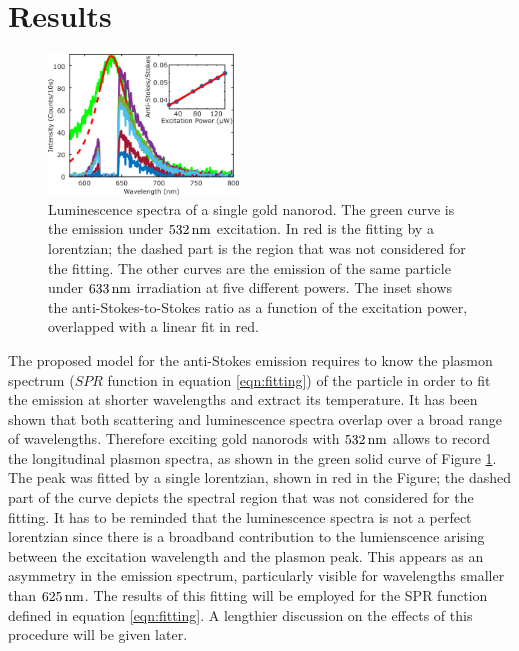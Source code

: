 \section{Results}
\begin{figure}[htp] \centering
\includegraphics[width=0.45\textwidth]{Chapters/04_Anti-Stokes/Figures/02_Several_Intensities/02_several_intensities.png}
\caption{Luminescence spectra of a single gold nanorod. The green curve is the
emission under $532\,\textrm{nm}$ excitation. In red is the fitting by a lorentzian; the
dashed part is the region that was not considered for the fitting. The other
curves are the emission of the same particle under $633\,\textrm{nm}$ irradiation at five 
different powers. The inset shows the anti-Stokes-to-Stokes ratio as a function
of the excitation power, overlapped with a linear fit in red.}
	\label{fig:spectra_rod}
\end{figure}

The proposed model for the anti-Stokes emission requires to know the plasmon
spectrum ($SPR$ function in equation \ref{eqn:fitting}) of the particle in order
to fit the emission at shorter wavelengths and extract its temperature. It has
been shown that both scattering and luminescence spectra overlap over a broad
range of wavelengths\cite{Yorulmaz2012}. Therefore exciting gold nanorods with
$532\,\textrm{nm}$ allows to record the longitudinal plasmon spectra, as shown in the
green solid curve of Figure \ref{fig:spectra_rod}. The peak was fitted by a
single lorentzian, shown in red in the Figure; the dashed part of the curve
depicts the spectral region that was not considered for the fitting. It has to
be reminded that the luminescence spectra is not a perfect lorentzian since
there is a broadband contribution to the lumienscence arising between the
excitation wavelength and the plasmon peak\cite{Boyd1986}. This appears as an
asymmetry in the emission spectrum, particularly visible for wavelengths smaller
than $625\,\textrm{nm}$. The results of this fitting will be employed for the SPR function
defined in equation \ref{eqn:fitting}. A lengthier discussion on the effects of
this procedure will be given later.


